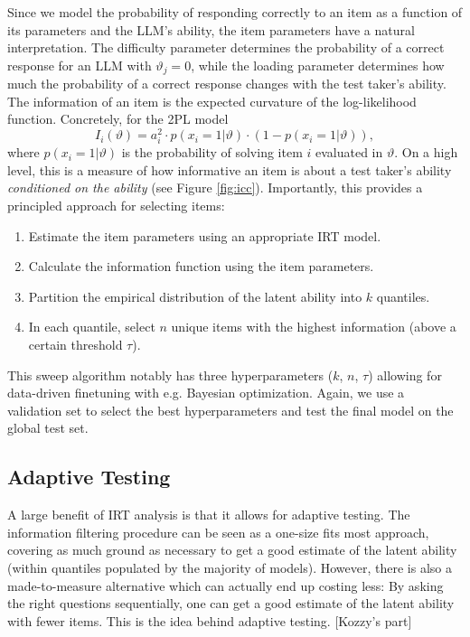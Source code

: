 \documentclass{article}
\begin{document}
Since we model the probability of responding correctly to an item as a function of its parameters and the LLM's ability, the item parameters have a natural interpretation. The difficulty parameter determines the probability of a correct response for an LLM with $\vartheta_j = 0$, while the loading parameter determines how much the probability of a correct response changes with the test taker's ability. The information of an item is the expected curvature of the log-likelihood function. Concretely, for the 2PL model $$I_i(\vartheta) = a_i^2 \cdot p(x_{i}=1|\vartheta) \cdot (1 - p(x_{i}=1|\vartheta)),$$ where $p(x_{i}=1|\vartheta)$ is the probability of solving item $i$ evaluated in $\vartheta$. On a high level, this is a measure of how informative an item is about a test taker's ability \textit{conditioned on the ability} (see Figure \ref{fig:icc}). Importantly, this provides a principled approach for selecting items:
\begin{enumerate}
   \item Estimate the item parameters using an appropriate IRT model.
   \item Calculate the information function using the item parameters.
   \item Partition the empirical distribution of the latent ability into $k$ quantiles.
   \item In each quantile, select $n$ unique items with the highest information (above a certain threshold $\tau$).
\end{enumerate}
This sweep algorithm notably has three hyperparameters ($k$, $n$, $\tau$) allowing for data-driven finetuning with e.g. Bayesian optimization. Again, we use a validation set to select the best hyperparameters and test the final model on the global test set.


\subsection{Adaptive Testing}
A large benefit of IRT analysis is that it allows for adaptive testing. The information filtering procedure can be seen as a one-size fits most approach, covering as much ground as necessary to get a good estimate of the latent ability (within quantiles populated by the majority of models). However, there is also a made-to-measure alternative which can actually end up costing less: By asking the right questions sequentially, one can get a good estimate of the latent ability with fewer items. This is the idea behind adaptive testing.
[Kozzy's part]
\end{document}
